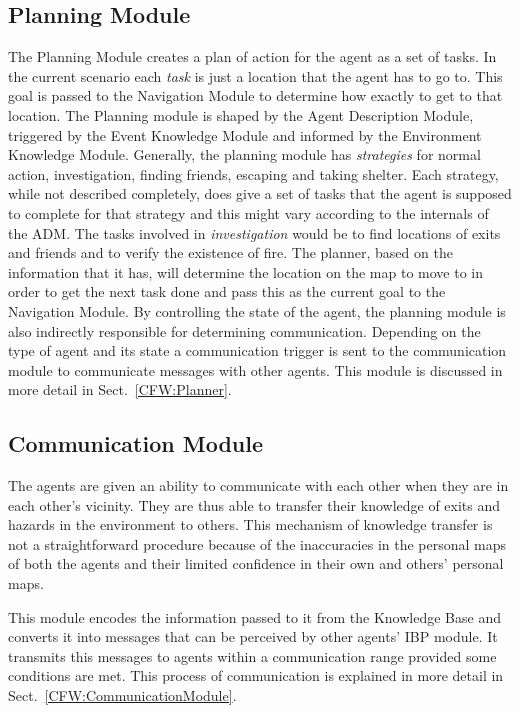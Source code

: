 \subsection{Planning Module}
\label{IBEVAC:PlanningModule}
The Planning Module creates a plan of action for the agent as a set of tasks. In the current scenario each \emph{task} is just a location that the agent has to go to. This goal is passed to the Navigation Module to determine how exactly to get to that location. The Planning module is shaped by the Agent Description Module, triggered by the Event Knowledge Module and informed by the Environment Knowledge Module. Generally, the planning module has \emph{strategies} for normal action, investigation, finding friends, escaping and taking shelter. Each strategy, while not described completely, does give a set of tasks that the agent is supposed to complete for that strategy and this might vary according to the internals of the ADM. The tasks involved in \emph{investigation} would be to find locations of exits and friends and to verify the existence of fire. The planner, based on the information that it has, will determine the location on the map to move to in order to get the next task done and pass this as the current goal to the Navigation Module. By controlling the state of the agent, the planning module is also indirectly responsible for determining communication. Depending on the type of agent and its state a communication trigger is sent to the communication module to communicate messages with other agents. This module is discussed in more detail in Sect.~\ref{CFW:Planner}.

\subsection{Communication Module}
\label{IBEVAC:CommunicationModule}
 The agents are given an ability to communicate with each other when they are in each other's vicinity. They are thus able to transfer their knowledge of exits and hazards in the environment to others. This mechanism of knowledge transfer is not a straightforward procedure because of the inaccuracies in the personal maps of both the agents and their limited confidence in their own and others' personal maps. 

 This module encodes the information passed to it from the Knowledge Base and converts it into messages that can be perceived by other agents' IBP module. It transmits this messages to agents within a communication range provided some conditions are met. This process of communication is explained in more detail in Sect.~\ref{CFW:CommunicationModule}.

